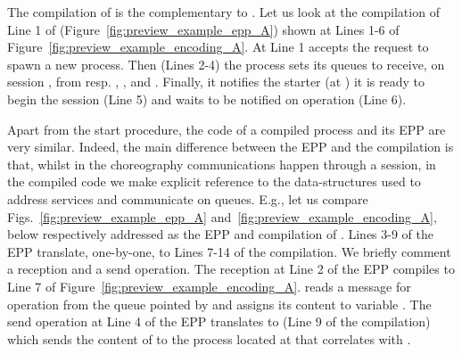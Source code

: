 The compilation of  is the complementary to
. Let us look at the compilation of Line 1 of  (Figure~\ref{fig:preview_example_epp_A}) shown at Lines 1-6 of
Figure~\ref{fig:preview_example_encoding_A}. At Line 1 
accepts the request to spawn a new process. Then (Lines 2-4) the process sets
its queues to receive, on session , from resp. , , and
. Finally, it notifies the starter (at ) it is
ready to begin the session (Line 5) and waits to be notified on operation
 (Line 6).

Apart from the start procedure, the code of a compiled process and its EPP
are very similar. Indeed, the main difference between the EPP and the
compilation is that, whilst in the choreography communications happen through
a session, in the compiled code we make explicit reference to the
data-structures used to address services and communicate on queues. E.g., let
us compare Figs.~\ref{fig:preview_example_epp_A}
and~\ref{fig:preview_example_encoding_A}, below respectively addressed as the
EPP and compilation of . Lines 3-9 of the EPP translate, one-by-one,
to Lines 7-14 of the compilation. We briefly comment a reception and a send
operation. The reception at Line 2 of the EPP compiles to Line 7 of
Figure~\ref{fig:preview_example_encoding_A}.  reads a message for operation 
from the queue pointed by  and assigns its content to
variable . The send operation at Line 4 of the EPP translates to
 (Line 9
of the compilation) which sends the content of  to the
process located at  that correlates with .



